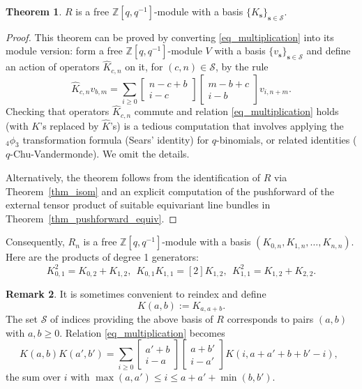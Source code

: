 \documentclass{article}
\def\Z{\mathbb Z}
\newcommand{\mcS}{\mathcal{S}}
\newcommand{\mbs}{\mathbf{s}}
\theoremstyle{definition}
\newtheorem{thm}{Theorem}[section]
\newtheorem{remark}[thm]{Remark}
\theoremstyle{definition}
\begin{document}
\begin{thm}\label{thm_R_free_mod}
    $R$ is a free $\Z[q,q^{-1}]$-module with a basis $\{K_{\mbs}\}_{\mbs\in \mcS}$.
\end{thm}

\begin{proof}
 This theorem can be proved by converting \eqref{eq_multiplication} into its module version: form  a free $\Z[q,q^{-1}]$-module $V$ with a basis $\{v_{\mbs}\}_{\mbs\in \mcS}$ and define an action of operators $\widehat{K}_{c,n}$ on it, for $(c,n)\in \mcS$, by the rule
\begin{equation}\label{eq_multiplication_mod}
\widehat{K}_{c,n}v_{b,m} = \sum_{i \ge 0} \begin{bmatrix} n - c + b \\ i - c \end{bmatrix} \begin{bmatrix} m - b + c \\ i - b \end{bmatrix}
v_{i,n+m}.
\end{equation}
Checking that operators $\widehat{K}_{c,n}$ commute and relation \eqref{eq_multiplication} holds (with $K$'s replaced by $\widehat{K}$'s) is a  tedious computation that involves applying the ${}_4\phi_3$ transformation formula (Sears' identity) for $q$-binomials, or related identities ($q$-Chu-Vandermonde). We omit the details.

Alternatively, the theorem follows from the identification of $R$ via Theorem~\ref{thm_isom}
and an explicit computation of the pushforward of the external tensor product of suitable equivariant line bundles in  Theorem~\ref{thm_pushforward_equiv}.
\end{proof}

Consequently, $R_n$ is a free $\Z[q,q^{-1}]$-module with a basis $(K_{0,n},K_{1,n},\dots, K_{n,n})$.
Here are the products of degree 1 generators:
    \[
    K_{0,1}^2 = K_{0,2} + K_{1,2}, \ \ K_{0,1}K_{1,1} = [2] K_{1,2}, \ \ K_{1,1}^2 = K_{1,2} + K_{2,2}.
    \]
\begin{remark}
    It is sometimes convenient to reindex and define
    \[K(a,b):=K_{a,a+b}.\]
    The set $\mcS$ of indices providing the above basis of $R$ corresponds to pairs $(a,b)$ with $a,b\ge 0$. Relation \eqref{eq_multiplication} becomes
    $$K(a,b)K(a',b') = \sum_{i \ge 0} \begin{bmatrix} a' + b \\ i - a \end{bmatrix} \begin{bmatrix} a + b' \\ i - a' \end{bmatrix} K(i, a + a' + b + b' - i), \ \ $$
    the sum over $i$ with
    $\max(a,a')\le i\le a+a'+\min(b,b')$.
\end{remark}
\end{document}
